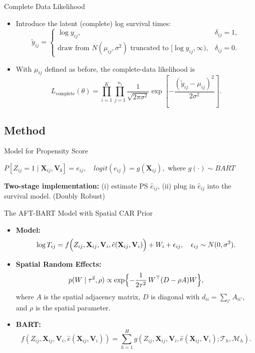 \documentclass{beamer}
\begin{document}
\begin{frame}{Complete Data Likelihood}
  \begin{itemize}
    \item Introduce the latent (complete) log survival times:
      \[
      \tilde{y}_{ij} =
      \begin{cases}
        \log y_{ij}, & \delta_{ij}=1, \\[1ex]
        \text{draw from } N(\mu_{ij},\sigma^2) \text{ truncated to } [\log y_{ij},\infty), & \delta_{ij}=0.
      \end{cases}
      \]
    \item With \(\mu_{ij}\) defined as before, the complete-data likelihood is
      \[
      L_{\text{complete}}(\theta) = \prod_{i=1}^K \prod_{j=1}^{n_i} \frac{1}{\sqrt{2\pi\sigma^2}}
      \exp\!\left[-\frac{(\tilde{y}_{ij} - \mu_{ij})^2}{2\sigma^2}\right].
      \]
  \end{itemize}
\end{frame}


\subsection{Method}
\begin{frame}{Model for Propensity Score}
   
  $P[Z_{ij}=1\mid \mathbf{X}_{ij},\mathbf{V_i}]=e_{ij}, \quad logit(e_{ij})=g(\mathbf{X}_{ij}),$ where $g(\cdot)\sim BART$
  
  
  
  \vspace{30pt}
  \textbf{Two-stage implementation:} (i) estimate PS $\hat{e}_{ij}$, (ii) plug in $\hat{e}_{ij}$ into the survival model. (Doubly Robust)
  
  \end{frame}


\begin{frame}{The AFT-BART Model with Spatial CAR Prior}
  \begin{itemize}
    \item \textbf{Model:} 
      \[
      \log T_{ij} = f\Bigl(Z_{ij},\mathbf{X}_{ij},\mathbf{V}_i,\hat{e}(\mathbf{X}_{ij},\mathbf{V}_i)\Bigr) + W_i + \epsilon_{ij},\quad \epsilon_{ij}\sim N(0,\sigma^2).
      \]
    \item \textbf{Spatial Random Effects:} 
      \[
      p(W\mid \tau^2,\rho) \propto \exp\Bigl\{-\frac{1}{2\tau^2}\,W^\top (D-\rho A)W\Bigr\},
      \]
      where \(A\) is the spatial adjacency matrix, \(D\) is diagonal with \(d_{ii}=\sum_{i'}A_{ii'}\), and \(\rho\) is the spatial parameter.
    \item \textbf{BART:} 
      \[
      f(Z_{ij},\mathbf{X}_{ij},\mathbf{V}_i,\hat{e}(\mathbf{X}_{ij},\mathbf{V}_i))=\sum_{h=1}^{H} g(Z_{ij},\mathbf{X}_{ij},\mathbf{V}_i,\hat{e}(\mathbf{X}_{ij},\mathbf{V}_i);\mathcal{T}_h,\mathcal{M}_h).
      \]
  \end{itemize}
\end{frame}
\end{document}
